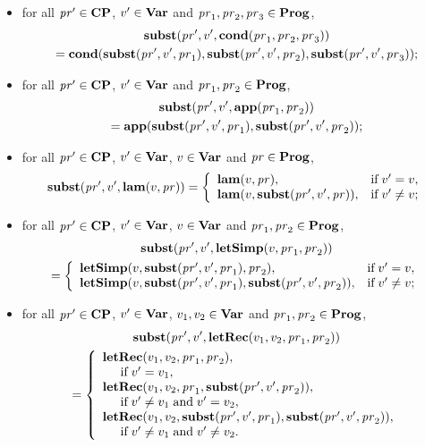 \begin{itemize}
\item for all $\mathit{pr}'\in\mathbf{CP}$, $v'\in\mathbf{Var}$ and $\mathit{pr}_1,\mathit{pr}_2,\mathit{pr}_3\in\mathbf{Prog}$,
  \begin{multline*}
    \mathbf{subst}(\mathit{pr}',v',\mathbf{cond}(\mathit{pr}_1,\mathit{pr}_2,\mathit{pr}_3)) \\
    = \mathbf{cond}(\mathbf{subst}(\mathit{pr}',v',\mathit{pr}_1),\mathbf{subst}(\mathit{pr}',v',\mathit{pr}_2),
      \mathbf{subst}(\mathit{pr}',v',\mathit{pr}_3)) ;
  \end{multline*}

\item for all $\mathit{pr}'\in\mathbf{CP}$, $v'\in\mathbf{Var}$ and $\mathit{pr}_1,\mathit{pr}_2\in\mathbf{Prog}$,
  \begin{multline*}
    \mathbf{subst}(\mathit{pr}',v',\mathbf{app}(\mathit{pr}_1,\mathit{pr}_2)) \\
    = \mathbf{app}(\mathbf{subst}(\mathit{pr}',v',\mathit{pr}_1),\mathbf{subst}(\mathit{pr}',v',\mathit{pr}_2)) ;
  \end{multline*}

\item for all $\mathit{pr}'\in\mathbf{CP}$, $v'\in\mathbf{Var}$, $v\in\mathbf{Var}$ and
  $\mathit{pr}\in\mathbf{Prog}$,
  \begin{displaymath}
    \subst(\pr',v',\proglam(v,\pr)) =
    \casesdef{\proglam(v,\pr),}{\eqtxtr{if} v'=v ,}%
    {\proglam(v,\subst(\pr',v',\pr)),}{\eqtxtr{if} v'\neq v ;}
  \end{displaymath}

\item for all $\mathit{pr}'\in\mathbf{CP}$, $v'\in\mathbf{Var}$, $v\in\mathbf{Var}$ and
  $\mathit{pr}_1,\mathit{pr}_2\in\mathbf{Prog}$,
  \begin{multline*}
    \subst(\pr',v',\progletSimp(v,\pr_1,\pr_2)) \\
    = \casesdef{\progletSimp(v,\subst(\pr',v',\pr_1),\pr_2),}%
    {\eqtxtr{if} v'=v,}%
    {\progletSimp(v,\subst(\pr',v',\pr_1),\subst(\pr',v',\pr_2)),}%
    {\eqtxtr{if} v'\neq v;}%
  \end{multline*}

\item for all $\mathit{pr}'\in\mathbf{CP}$, $v'\in\mathbf{Var}$, $v_1,v_2\in\mathbf{Var}$ and
  $\mathit{pr}_1,\mathit{pr}_2\in\mathbf{Prog}$,
  \begin{multline*}
    \mathbf{subst}(\mathit{pr}',v',\mathbf{letRec}(v_1,v_2,\mathit{pr}_1,\mathit{pr}_2)) \\
    = \left\{ \begin{array}{l}
        \mathbf{letRec}(v_1,v_2,\mathit{pr}_1,\mathit{pr}_2), \\
        \hspace*{.5cm}\allowbreak\mbox{if}\allowbreak\; v'=v_1, \\
        \mathbf{letRec}(v_1,v_2,\mathit{pr}_1,\mathbf{subst}(\mathit{pr}',v',\mathit{pr}_2)), \\
        \hspace*{.5cm}\allowbreak\mbox{if}\allowbreak\; v'\neq v_1\;\allowbreak\mbox{and}\allowbreak\; v'=v_2 , \\
        \mathbf{letRec}(v_1,v_2,\mathbf{subst}(\mathit{pr}',v',\mathit{pr}_1),
          \mathbf{subst}(\mathit{pr}',v',\mathit{pr}_2)), \\
        \hspace*{.5cm}\allowbreak\mbox{if}\allowbreak\; v'\neq v_1\;\allowbreak\mbox{and}\allowbreak\; v'\neq v_2 .
      \end{array} \right.
  \end{multline*}
\end{itemize}

